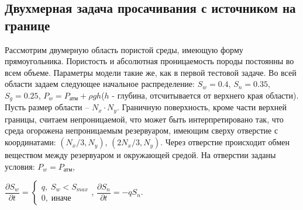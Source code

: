 
\subsection{Двухмерная задача просачивания с источником на границе}
Рассмотрим двумерную область пористой среды, имеющую форму
прямоугольника. Пористость и абсолютная проницаемость породы постоянны во всем
объеме. Параметры модели такие же, как
в первой тестовой задаче.
Во всей области задаем следующее 
начальное распределение: $S_w=0.4$,\; $S_n=0.35$,\; $S_g=0.25$, 
$P_w=P_\text{атм}+\rho g h$($h$ - глубина, отсчитывается от верхнего края области).
Пусть размер области -- $N_x\cdot N_y$.
Граничную поверхность, кроме части верхней границы, считаем непроницаемой, 
что может быть интерпретировано так,
что среда огорожена непроницаемым резервуаром, имеющим сверху отверстие с
координатами: $(N_x/3, N_y)$, $(2N_x/3, N_y)$. Через отверстие происходит обмен веществом между 
резервуаром и окружающей средой. На отверстии заданы условия: $P_w=P_\text{атм}$,

$ \dfrac{\partial S_w}{\partial t}= 
\begin{cases}
 q, \; S_w<S_{max}\\
 0, \; \text{иначе}
\end{cases}
$,
$ \dfrac{\partial S_n}{\partial t}=-q S_n$.

